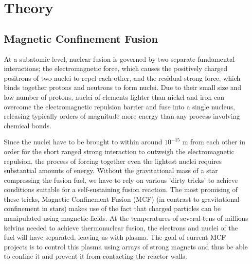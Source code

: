 \chapter{Theory}

\section{Magnetic Confinement Fusion}
At a subatomic level, nuclear fusion is governed by two separate fundamental interactions; the electromagnetic force, which causes the positively charged positrons of two nuclei to repel each other, and the residual strong force, which binds together protons and neutrons to form nuclei. 
Due to their small size and low number of protons, nuclei of elements lighter than nickel and iron can overcome the electromagnetic repulsion barrier and fuse into a single nucleus, releasing typically orders of magnitude more energy than any process involving chemical bonds.

Since the nuclei have to be brought to within around $10^{-15}$ m from each other in order for the short ranged strong interaction to outweigh the electromagnetic repulsion, the process of forcing together even the lightest nuclei requires substantial amounts of energy.  
Without the gravitational mass of a star compressing the fusion fuel, we have to rely on various 'dirty tricks' to achieve conditions suitable for a self-sustaining fusion reaction. 
The most promising of these tricks, Magnetic Confinement Fusion (MCF) (in contrast to gravitational confinement in stars) makes use of the fact that charged particles can be manipulated using magnetic fields. 
At the temperatures of several tens of millions kelvins needed to achieve thermonuclear fusion, the electrons and nuclei of the fuel will have separated, leaving us with plasma. 
The goal of current MCF projects is to control this plasma using arrays of strong magnets and thus be able to confine it and prevent it from contacting the reactor walls. 


